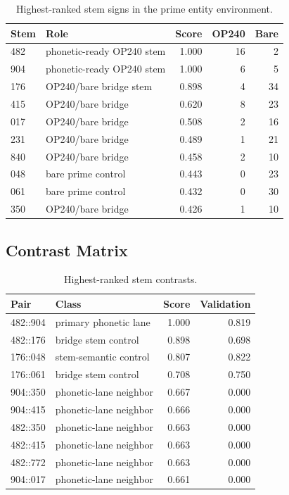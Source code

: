 \begin{table}[htbp]
\centering
\scriptsize
\begin{tabular}{lp{}rrr}
\toprule
\textbf{Stem} & \textbf{Role} & \textbf{Score} & \textbf{OP240} & \textbf{Bare} \\
\midrule
482 & phonetic-ready OP240 stem & 1.000 & 16 & 2 \\
904 & phonetic-ready OP240 stem & 1.000 & 6 & 5 \\
176 & OP240/bare bridge stem & 0.898 & 4 & 34 \\
415 & OP240/bare bridge & 0.620 & 8 & 23 \\
017 & OP240/bare bridge & 0.508 & 2 & 16 \\
231 & OP240/bare bridge & 0.489 & 1 & 21 \\
840 & OP240/bare bridge & 0.458 & 2 & 10 \\
048 & bare prime control & 0.443 & 0 & 23 \\
061 & bare prime control & 0.432 & 0 & 30 \\
350 & OP240/bare bridge & 0.426 & 1 & 10 \\
\bottomrule
\end{tabular}
\caption{Highest-ranked stem signs in the prime entity environment.}
\label{tab:stem-lattice-keystone-stems}
\end{table}

\subsection{Contrast Matrix}

\begin{table}[htbp]
\centering
\scriptsize
\begin{tabular}{lp{}rr}
\toprule
\textbf{Pair} & \textbf{Class} & \textbf{Score} & \textbf{Validation} \\
\midrule
482::904 & primary phonetic lane & 1.000 & 0.819 \\
482::176 & bridge stem control & 0.898 & 0.698 \\
176::048 & stem-semantic control & 0.807 & 0.822 \\
176::061 & bridge stem control & 0.708 & 0.750 \\
904::350 & phonetic-lane neighbor & 0.667 & 0.000 \\
904::415 & phonetic-lane neighbor & 0.666 & 0.000 \\
482::350 & phonetic-lane neighbor & 0.663 & 0.000 \\
482::415 & phonetic-lane neighbor & 0.663 & 0.000 \\
482::772 & phonetic-lane neighbor & 0.663 & 0.000 \\
904::017 & phonetic-lane neighbor & 0.661 & 0.000 \\
\bottomrule
\end{tabular}
\caption{Highest-ranked stem contrasts.}
\label{tab:stem-lattice-keystone-pairs}
\end{table}

